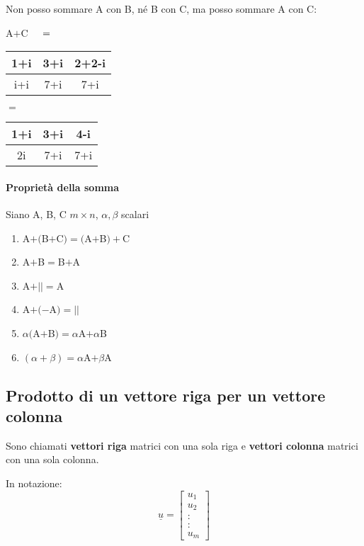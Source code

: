 Non posso sommare A con B, né B con C, ma posso sommare A con C:\\

\begin{center}
    A$+$C$\hspace{0.5cm}=\hspace{0.5cm}$
    \begin{tabular}{|c|c|c|}
        \hline
        1+i & 3+i & 2+2-i\\
        \hline
        i+i & 7+i & 7+i\\
        \hline
    \end{tabular}
    \hspace{0.5cm}$=$\hspace{0.5cm}
    \begin{tabular}{|c|c|c|}
        \hline
        1+i & 3+i & 4-i\\
        \hline
        2i & 7+i & 7+i\\
        \hline
    \end{tabular}
\end{center}
\paragraph{Proprietà della somma} Siano A, B, C $m\times n$, $\alpha,\beta$ scalari
\begin{enumerate}
    \item A$+($B$+$C$)=($A$+$B$)+$C
    \item A$+$B$=$B$+$A
    \item A$+||=$A
    \item A$+(-$A$)=||$
    \item $\alpha($A$+$B$)=\alpha$A$+\alpha$B
    \item $(\alpha + \beta) = \alpha$A$ +\beta$A
\end{enumerate}

\subsection{Prodotto di un vettore riga per un vettore colonna}
Sono chiamati \textbf{vettori riga} matrici con una sola riga e \textbf{vettori colonna} matrici con una sola colonna.

In notazione:
$$\underline u = 
\begin{bmatrix} 
    u_1 \\ u_2 \\ : \\ : \\ u_m
\end{bmatrix} 
$$


